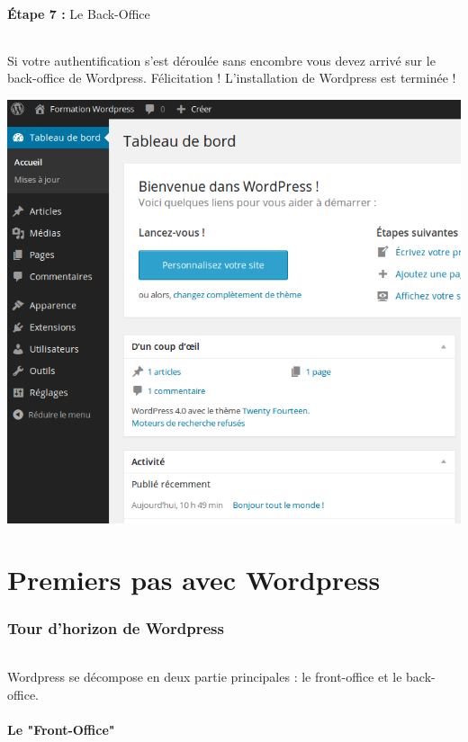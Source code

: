 \documentclass[10pt,a4paper]{article}
\begin{document}
\paragraph{}\textbf{Étape 7 : }Le Back-Office
\paragraph{}Si votre authentification s'est déroulée sans encombre vous devez arrivé sur le back-office de Wordpress. Félicitation ! L'installation de Wordpress est terminée !
\begin{center}
\includegraphics[scale=0.5]{img/0046.png}
\end{center}
\newpage

\part{Premiers pas avec Wordpress}
\newpage

\section{Tour d'horizon de Wordpress}
\paragraph{}Wordpress se décompose en deux partie principales : le front-office et le back-office.
\subsection{Le "Front-Office"}
\end{document}
